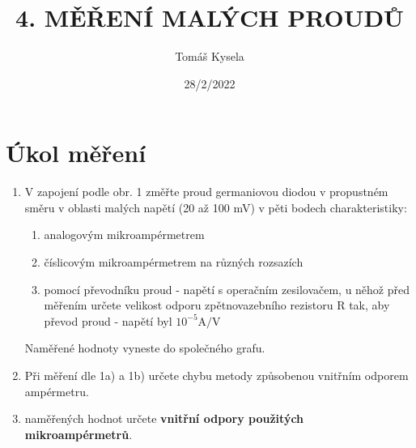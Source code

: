 \documentclass{article}
\title{\textbf{4. MĚŘENÍ MALÝCH PROUDŮ}}
\author{Tomáš Kysela}
\date{28/2/2022}
\begin{document}
	
	\maketitle
	
	\section{Úkol měření}
	\begin{enumerate}
		\item V zapojení podle obr. 1 změřte proud germaniovou diodou v propustném  směru v oblasti malých napětí (20 až 100 mV) v pěti bodech charakteristiky:
		\begin{enumerate}
			\item analogovým mikroampérmetrem
			\item číslicovým mikroampérmetrem na různých rozsazích
			\item pomocí převodníku proud - napětí s operačním zesilovačem, u něhož před měřením určete velikost odporu zpětnovazebního rezistoru R tak, aby převod proud - napětí byl $10^{-5} \si{\ampere\per\volt}$
		\end{enumerate}
		Naměřené hodnoty vyneste do společného grafu.
		\item Při měření dle 1a) a 1b) určete chybu metody způsobenou vnitřním odporem ampérmetru.
		\item  naměřených hodnot určete \textbf{vnitřní odpory použitých mikroampérmetrů}.
	\end{enumerate}
	
\end{document}
